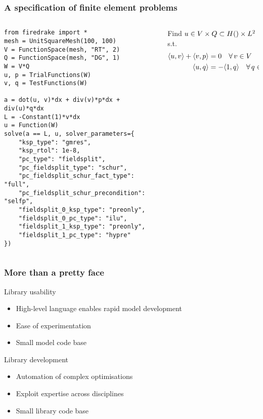 \documentclass[presentation]{beamer}
\let\div\relax
\DeclareMathOperator{\div}{div}
\newcommand{\inner}[2]{\ensuremath{\langle #1, #2 \rangle}}
\begin{document}
\begin{frame}[fragile]
  \frametitle{A specification of finite element problems}
  \begin{columns}
    \begin{column}{0.65\textwidth}
\begin{verbatim}
from firedrake import *
mesh = UnitSquareMesh(100, 100)
V = FunctionSpace(mesh, "RT", 2)
Q = FunctionSpace(mesh, "DG", 1)
W = V*Q
u, p = TrialFunctions(W)
v, q = TestFunctions(W)

a = dot(u, v)*dx + div(v)*p*dx + div(u)*q*dx
L = -Constant(1)*v*dx
u = Function(W)
solve(a == L, u, solver_parameters={
    "ksp_type": "gmres", 
    "ksp_rtol": 1e-8,
    "pc_type": "fieldsplit",
    "pc_fieldsplit_type": "schur",
    "pc_fieldsplit_schur_fact_type": "full",
    "pc_fieldsplit_schur_precondition": "selfp",
    "fieldsplit_0_ksp_type": "preonly",
    "fieldsplit_0_pc_type": "ilu",
    "fieldsplit_1_ksp_type": "preonly",
    "fieldsplit_1_pc_type": "hypre"
})
\end{verbatim}
    \end{column}
    \hspace{-4em}
    \begin{column}{0.5\textwidth}
      Find $u\in V\times Q\subset H(\div)\times L^2$ s.t.
      \begin{align*}
        \inner{u}{v} + \inner{\div v}{p} &= 0 \quad\forall\, v \in V\\
        \inner{\div u}{q} &= -\inner{1}{q}\quad\forall\, q \in Q.
      \end{align*}
    \end{column}
  \end{columns}
\end{frame}


\begin{frame}
  \frametitle{More than a pretty face}

  \begin{block}{Library usability}
    \begin{itemize}
    \item High-level language enables rapid model development
    \item Ease of experimentation
    \item Small model code base
    \end{itemize}
  \end{block}

  \begin{block}{Library development}
    \begin{itemize}
    \item Automation of complex optimisations
    \item Exploit expertise across disciplines
    \item Small library code base
    \end{itemize}
  \end{block}
\end{frame}
\end{document}
